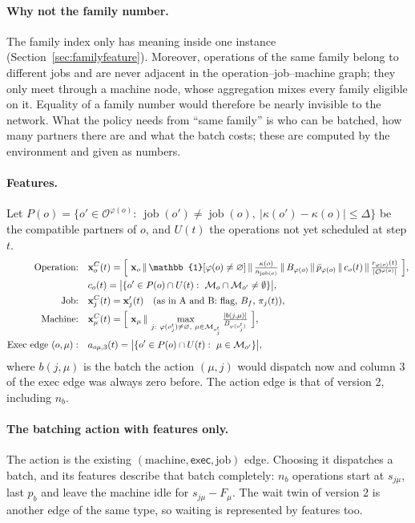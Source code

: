 \documentclass[11pt,a4paper]{article}
\newcommand{\Oset}{\mathcal{O}}
\newcommand{\Mset}{\mathcal{M}}
\newcommand{\job}{\operatorname{job}}
\newcommand{\cat}{\,\Vert\,}
\begin{document}
\paragraph{Why not the family number.} The family index only has meaning inside one instance
(Section~\ref{sec:familyfeature}). Moreover, operations of the same family belong to different
jobs and are never adjacent in the operation--job--machine graph; they only meet through a
machine node, whose aggregation mixes every family eligible on it. Equality of a family number
would therefore be nearly invisible to the network. What the policy needs from ``same family''
is who can be batched, how many partners there are and what the batch costs; these are
computed by the environment and given as numbers.

\paragraph{Features.} Let $P(o)=\{o'\in\Oset^{\varphi(o)}:\ \job(o')\neq\job(o),\
|\kappa(o')-\kappa(o)|\le\Delta\}$ be the compatible partners of $o$, and $U(t)$ the operations
not yet scheduled at step $t$.
\begin{align}
  \text{Operation:}\quad & \mathbf{x}^C_o(t)=\Bigl[\ \mathbf{x}_o \cat \mathbb{1}[\varphi(o)\neq\varnothing]
     \cat \tfrac{\kappa(o)}{n_{\job(o)}} \cat B_{\varphi(o)} \cat \bar p_{\varphi(o)}
     \cat c_o(t) \cat \tfrac{r_{\varphi(o)}(t)}{|\Oset^{\varphi(o)}|}\ \Bigr],\\
  & c_o(t)=\bigl|\{o'\in P(o)\cap U(t):\ \Mset_o\cap\Mset_{o'}\neq\emptyset\}\bigr|,\\
  \text{Job:}\quad & \mathbf{x}^C_j(t)=\mathbf{x}'_j(t)\quad\text{(as in A and B: flag, $B_f$, $\pi_j(t)$)},\\
  \text{Machine:}\quad & \mathbf{x}^C_\mu(t)=\Bigl[\ \mathbf{x}_\mu \cat
     \max_{j:\ \varphi(o_j^t)\neq\varnothing,\ \mu\in\Mset_{o_j^t}} \tfrac{|b(j,\mu)|}{B_{\varphi(o_j^t)}}\ \Bigr],\\
  \text{Exec edge }(o,\mu):\quad & a_{o\mu,3}(t)=\bigl|\{o'\in P(o)\cap U(t):\ \mu\in\Mset_{o'}\}\bigr|,
\end{align}
where $b(j,\mu)$ is the batch the action $(\mu,j)$ would dispatch now and column 3 of the exec
edge was always zero before. The action edge is that of version 2, including $n_b$.

\paragraph{The batching action with features only.} The action is the existing
$(\text{machine},\textsf{exec},\text{job})$ edge. Choosing it dispatches a batch, and its
features describe that batch completely: $n_b$ operations start at $s_{j\mu}$, last $p_b$ and
leave the machine idle for $s_{j\mu}-F_\mu$. The wait twin of version 2 is another edge of the
same type, so waiting is represented by features too.
\end{document}
